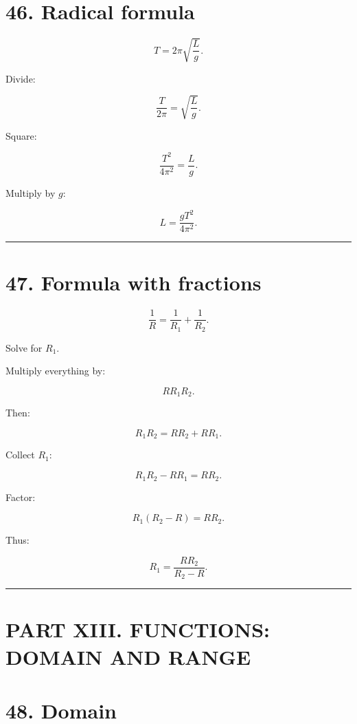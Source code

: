 \documentclass[
]{article}
\begin{document}
\section{46. Radical formula}\label{radical-formula}

\[
T=2\pi\sqrt{\frac Lg}.
\]

Divide:

\[
\frac{T}{2\pi}
=
\sqrt{\frac Lg}.
\]

Square:

\[
\frac{T^2}{4\pi^2}
=
\frac Lg.
\]

Multiply by \(g\):

\[
\boxed{L=\frac{gT^2}{4\pi^2}}.
\]

\begin{center}\rule{0.5\linewidth}{0.5pt}\end{center}

\section{47. Formula with fractions}\label{formula-with-fractions}

\[
\frac1R=\frac1{R_1}+\frac1{R_2}.
\]

Solve for \(R_1\).

Multiply everything by:

\[
RR_1R_2.
\]

Then:

\[
R_1R_2=RR_2+RR_1.
\]

Collect \(R_1\):

\[
R_1R_2-RR_1=RR_2.
\]

Factor:

\[
R_1(R_2-R)=RR_2.
\]

Thus:

\[
\boxed{R_1=\frac{RR_2}{R_2-R}}.
\]

\begin{center}\rule{0.5\linewidth}{0.5pt}\end{center}

\section{PART XIII. FUNCTIONS: DOMAIN AND
RANGE}\label{part-xiii.-functions-domain-and-range}

\section{48. Domain}\label{domain}
\end{document}
